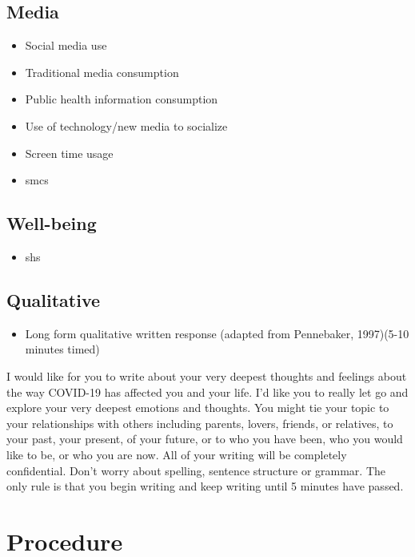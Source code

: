 \documentclass[]{book}
\providecommand{\tightlist}{%
  \setlength{\itemsep}{0pt}\setlength{\parskip}{0pt}}
\begin{document}
\hypertarget{media}{%
\subsection{Media}\label{media}}

\begin{itemize}
\tightlist
\item
  Social media use
\item
  Traditional media consumption
\item
  Public health information consumption
\item
  Use of technology/new media to socialize
\item
  Screen time usage
\item
  smcs
\end{itemize}

\hypertarget{well-being}{%
\subsection{Well-being}\label{well-being}}

\begin{itemize}
\tightlist
\item
  shs
\end{itemize}

\hypertarget{qualitative}{%
\subsection{Qualitative}\label{qualitative}}

\begin{itemize}
\tightlist
\item
  Long form qualitative written response (adapted from Pennebaker, 1997)(5-10 minutes timed)
\end{itemize}

I would like for you to write about your very deepest thoughts and feelings about the way COVID-19 has affected you and your life. I'd like you to really let go and explore your very deepest emotions and thoughts. You might tie your topic to your relationships with others including parents, lovers, friends, or relatives, to your past, your present, of your future, or to who you have been, who you would like to be, or who you are now. All of your writing will be completely confidential. Don't worry about spelling, sentence structure or grammar. The only rule is that you begin writing and keep writing until 5 minutes have passed.

\hypertarget{procedure}{%
\section{Procedure}\label{procedure}}
\end{document}
